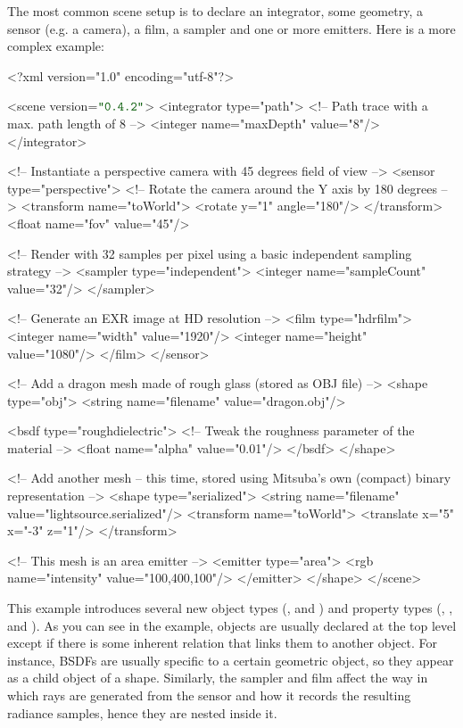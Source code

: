 The most common scene setup is to declare an integrator, some geometry, a sensor (e.g. a camera), a film, a sampler
and one or more emitters. Here is a more complex example:
\begin{xml}
<?xml version="1.0" encoding="utf-8"?>

<scene version=$\MtsVer$>
	<integrator type="path">
		<!-- Path trace with a max. path length of 8 -->
		<integer name="maxDepth" value="8"/>
	</integrator>

	<!-- Instantiate a perspective camera with 45 degrees field of view -->
	<sensor type="perspective">
		<!-- Rotate the camera around the Y axis by 180 degrees -->
		<transform name="toWorld">
			<rotate y="1" angle="180"/>
		</transform>
		<float name="fov" value="45"/>

		<!-- Render with 32 samples per pixel using a basic
             independent sampling strategy -->
		<sampler type="independent">
			<integer name="sampleCount" value="32"/>
		</sampler>

		<!-- Generate an EXR image at HD resolution -->
		<film type="hdrfilm">
			<integer name="width" value="1920"/>
			<integer name="height" value="1080"/>
		</film>
	</sensor>

	<!-- Add a dragon mesh made of rough glass (stored as OBJ file) -->
	<shape type="obj">
		<string name="filename" value="dragon.obj"/>

		<bsdf type="roughdielectric">
			<!-- Tweak the roughness parameter of the material -->
			<float name="alpha" value="0.01"/>
		</bsdf>
	</shape>

	<!-- Add another mesh -- this time, stored using Mitsuba's own
	     (compact) binary representation -->
	<shape type="serialized">
		<string name="filename" value="lightsource.serialized"/>
		<transform name="toWorld">
			<translate x="5" x="-3" z="1"/>
		</transform>

		<!-- This mesh is an area emitter -->
		<emitter type="area">
			<rgb name="intensity" value="100,400,100"/>
		</emitter>
	</shape>
</scene>
\end{xml}
This example introduces several new object types (, and )
and property types (, , and ).
As you can see in the example, objects are usually declared at the top level except if there is some
inherent relation that links them to another object. For instance, BSDFs are usually specific to a certain geometric object, so
they appear as a child object of a shape. Similarly, the sampler and film affect the way in which
rays are generated from the sensor and how it records the resulting radiance samples, hence they are nested inside it.

